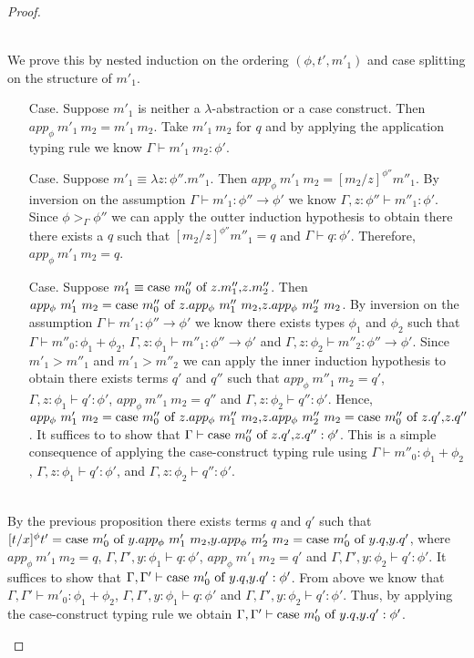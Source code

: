 \begin{proof}
\begin{itemize}
  \ \\
  We prove this by nested induction on the ordering $(\phi, t', m'_1)$ and case splitting on 
  the structure of $m'_1$.
  \begin{itemize}
  \item[Case.] Suppose $m'_1$ is neither a $\lambda$-abstraction or a case construct.  Then\\
    $app_\phi\  m'_1\ m_2 = m'_1\ m_2$.  Take $m'_1\ m_2$ for $q$ and by applying the application typing rule
    we know $\Gamma \vdash m'_1\ m_2:\phi'$.
    
  \item[Case.] Suppose $m'_1 \equiv \lambda z:\phi''.m''_1$.  Then $app_\phi\ m'_1\ m_2 = [m_2/z]^{\phi''} m''_1$.
    By inversion on the assumption $\Gamma \vdash m'_1:\phi'' \to \phi'$ we know 
    $\Gamma,z:\phi'' \vdash m''_1:\phi'$.  Since $\phi >_{\Gamma} \phi''$ we can apply the outter induction
    hypothesis to obtain there there exists a $q$ such that $[m_2/z]^{\phi''} m''_1 = q$ and 
    $\Gamma \vdash q:\phi'$.  Therefore, $app_\phi\ m'_1\ m_2 = q$.
    
  \item[Case.] Suppose $m'_1 \equiv \mbox{case}\ m''_0\ \text{of}\ z\text{.}m''_1\text{,}z\text{.}m''_2$.  Then\\
    $app_\phi\ m'_1\ m_2 = \mbox{case}\ m''_0\ \text{of}\ z\text{.}app_\phi\ m''_1\ m_2\text{,}z\text{.}app_\phi\ m''_2\ m_2$.  By inversion on the assumption
    $\Gamma \vdash m'_1:\phi''\to\phi'$ we know there exists types $\phi_1$ and $\phi_2$ such that
    $\Gamma \vdash m''_0:\phi_1+\phi_2$, $\Gamma,z:\phi_1 \vdash m''_1:\phi''\to\phi'$
    and $\Gamma,z:\phi_2 \vdash m''_2:\phi''\to\phi'$.  Since $m'_1 > m''_1$ and $m'_1 > m''_2$ we can 
    apply the inner induction hypothesis to obtain there exists terms $q'$ and $q''$ such that 
    $app_\phi\ m''_1\ m_2 = q'$, $\Gamma,z:\phi_1 \vdash q':\phi'$, $app_\phi\ m''_1\ m_2 = q''$ and $\Gamma,z:\phi_2 \vdash q'':\phi'$.  
    Hence, 
    $app_\phi\ m'_1\ m_2 = \mbox{case}\ m''_0\ \text{of}\ z\text{.}app_\phi\ m''_1\ m_2\text{,}z\text{.}app_\phi\ m''_2\ m_2 = \mbox{case}\ m''_0\ \text{of}\ z\text{.}q'\text{,}z\text{.}q''$.  It suffices to 
    to show that $\Gamma \vdash \mbox{case}\ m''_0\ \text{of}\ z\text{.}q'\text{,}z\text{.}q'':\phi'$.  This is a simple consequence of applying the
    case-construct typing rule using $\Gamma \vdash m''_0:\phi_1+\phi_2$, $\Gamma,z:\phi_1 \vdash q':\phi'$, and
    $\Gamma,z:\phi_2 \vdash q'':\phi'$.        
  \end{itemize}

   
  \ \\
  By the previous proposition there exists terms $q$ and $q'$ such that \\
  $[t/x]^\phi t' = \ccon{m'_0}{y}{app_\phi\ m'_1\ m_2}{app_\phi\ m'_2\ m_2}
  = \ccon{m'_0}{y}{q}{q'}$, where $app_\phi\ m'_1\ m_2 = q$, $\Gamma,\Gamma',y:\phi_1 \vdash q:\phi'$, $app_\phi\ m'_1\ m_2 = q'$
  and $\Gamma,\Gamma',y:\phi_2 \vdash q':\phi'$.  It suffices to show that
  $\Gamma, \Gamma' \vdash \mbox{case}\ m'_0\ \text{of}\ y\text{.}q\text{,}y\text{.}q':\phi'$.  From above we know that $\Gamma,\Gamma' \vdash m'_0:\phi_1+\phi_2$, 
  $\Gamma,\Gamma',y:\phi_1 \vdash q:\phi'$ and $\Gamma,\Gamma',y:\phi_2 \vdash q':\phi'$.  Thus,
  by applying the case-construct typing rule we obtain $\Gamma, \Gamma' \vdash \mbox{case}\ m'_0\ \text{of}\ y\text{.}q\text{,}y\text{.}q':\phi'$.
  

\end{itemize}
\end{proof}
